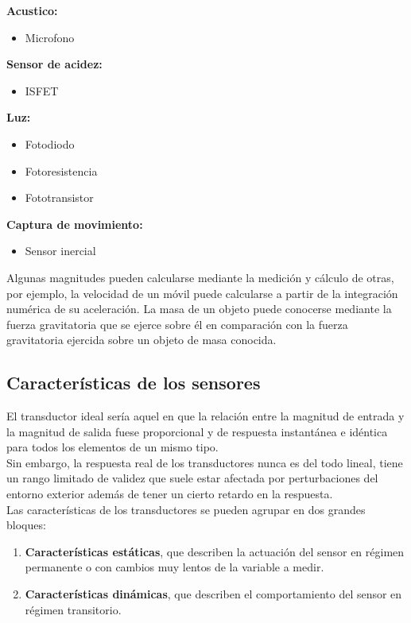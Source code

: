 \textbf{Acustico:}
\begin{itemize}
  \item     Microfono
\end{itemize}

\textbf{Sensor de acidez:}
\begin{itemize}
  \item     ISFET
\end{itemize}

\textbf{Luz:}
\begin{itemize}
  \item     Fotodiodo
  \item     Fotoresistencia
  \item     Fototransistor
\end{itemize}

\textbf{Captura de movimiento:}
\begin{itemize}
  \item     Sensor inercial
\end{itemize}

Algunas magnitudes pueden calcularse mediante la medición y cálculo de otras, por ejemplo, la velocidad de un móvil puede calcularse a partir de la integración numérica de su 
aceleración. La masa de un objeto puede conocerse mediante la fuerza gravitatoria que se ejerce sobre él en comparación con la fuerza gravitatoria ejercida sobre un objeto de 
masa conocida. \\

\subsection{Características de los sensores}

El transductor  ideal  sería  aquel  en  que  la  relación  entre la magnitud de entrada y la 
magnitud de salida fuese proporcional y de respuesta instantánea e idéntica para todos los elementos de un mismo tipo. \\

Sin  embargo, la  respuesta  real  de  los  transductores  nunca  es del todo lineal, tiene un rango  limitado  de  validez que  suele  estar afectada por perturbaciones del entorno exterior además de tener un cierto retardo en la respuesta. \\

Las características de los transductores se pueden agrupar en dos grandes bloques:\\

\begin{enumerate}
 \item \textbf{Características estáticas}, que describen la actuación del sensor en régimen permanente o 
con cambios muy lentos de la variable a medir. \\
 \item \textbf{Características dinámicas}, que describen el comportamiento del sensor en régimen transitorio.\\
\end{enumerate}

